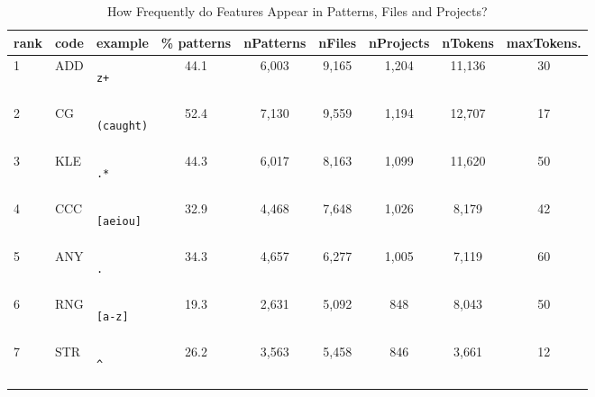 \begin{table*}
\begin{center}
\begin{footnotesize}
\caption{How Frequently do Features Appear in Patterns, Files and Projects?}
\label{table:featureStatsOnly}
\begin{tabular}
{lllcccc  cc}
rank & code & example & \% patterns & nPatterns & nFiles & nProjects & nTokens & maxTokens. \\
\toprule[0.16em]
1 & ADD & \begin{minipage}{0.5in}\begin{verbatim}z+\end{verbatim}\end{minipage} & 44.1 & 6,003 & 9,165 & 1,204 & 11,136 & 30 \\
\midrule
2 & CG & \begin{minipage}{0.5in}\begin{verbatim}(caught)\end{verbatim}\end{minipage} & 52.4 & 7,130 & 9,559 & 1,194 & 12,707 & 17 \\
\midrule
3 & KLE & \begin{minipage}{0.5in}\begin{verbatim}.*\end{verbatim}\end{minipage} & 44.3 & 6,017 & 8,163 & 1,099 & 11,620 & 50 \\
\midrule
4 & CCC & \begin{minipage}{0.5in}\begin{verbatim}[aeiou]\end{verbatim}\end{minipage} & 32.9 & 4,468 & 7,648 & 1,026 & 8,179 & 42 \\
\midrule
5 & ANY & \begin{minipage}{0.5in}\begin{verbatim}.\end{verbatim}\end{minipage} & 34.3 & 4,657 & 6,277 & 1,005 & 7,119 & 60 \\
\midrule
6 & RNG & \begin{minipage}{0.5in}\begin{verbatim}[a-z]\end{verbatim}\end{minipage} & 19.3 & 2,631 & 5,092 & 848 & 8,043 & 50 \\
\midrule
7 & STR & \begin{minipage}{0.5in}\begin{verbatim}^\end{verbatim}\end{minipage} & 26.2 & 3,563 & 5,458 & 846 & 3,661 & 12 \\

\end{tabular}
\end{footnotesize}
\end{center}
\end{table*}
